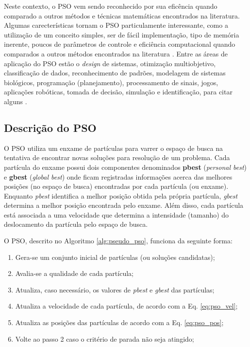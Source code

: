 \documentclass[
	12pt,				%
	openany,			%
	oneside,	
	a4paper,			%
	brazil,				%
	]{unimontes-ppgmsc-abntex2}
\begin{document}
Neste contexto, o PSO vem sendo reconhecido por sua eficência quando comparado a outros métodos e técnicas matemáticas encontrados na literatura. Algumas carecterísticas tornam o PSO particulamente interessante, como a utilização de um conceito simples, ser de fácil implementação, tipo de memória inerente, poucos de parâmetros de controle e eficiência computacional quando comparados a outros métodos encontrados na literatura \cite{Valle_2008}. Entre as áreas de aplicação do PSO estão o {\em design} de sistemas, otimização multiobjetivo, classificação de dados, reconhecimento de padrões, modelagem de sistemas biológicos, programação (planejamento), processamento de sinais, jogos, aplicações robóticas, tomada de decisão, simulação e identificação, para citar alguns \cite{Kennedy_2001}.

  

\subsection{Descrição do PSO}
\label{sec:desc_pso}

O PSO utiliza um enxame de partículas para varrer o espaço de busca na tentativa de encontrar novas soluções para resolução de um problema. Cada partícula do enxame possui dois componentes denominados \textbf{pbest} ({\em personal best}) e \textbf{gbest} ({\em global best}) onde ficam registradas informações acerca das melhores posições (no espaço de busca) encontradas por cada partícula (ou enxame). Enquanto {\em pbest} identifica a melhor posição obtida pela própria partícula, {\em gbest} determina a melhor posição encontrada pelo enxame. Além disso, cada partícula está associada a uma velocidade que determina a intensidade (tamanho) do deslocamento da partícula pelo espaço de busca. 

O PSO, descrito no Algoritmo \ref{alg:pseudo_pso}, funciona da seguinte forma: 

\begin{enumerate}[label=\arabic*)]
\item Gera-se um conjunto inicial de partículas (ou soluções candidatas);
\item Avalia-se a qualidade de cada partícula;
\item Atualiza, caso necessário, os valores de {\em pbest} e {\em gbest} das partículas;
\item Atualiza a velocidade de cada partícula, de acordo com a Eq. \ref{eq:pso_vel};
\item Atualiza as posições das partículas de acordo com a Eq. \ref{eq:pso_pos};
\item Volte ao passo 2 caso o critério de parada não seja atingido;
\end{enumerate}
\end{document}
